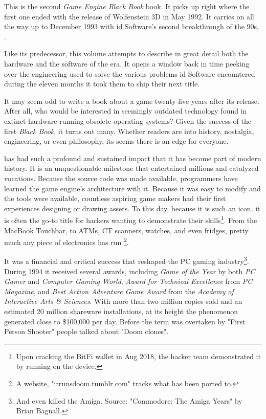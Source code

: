 This is the second \textit{Game Engine Black Book} book. It picks up right where the first one ended with the release of Wolfenstein 3D in May 1992. It carries on all the way up to December 1993 with id Software's second breakthrough of the 90s, \doom{}.\\ %
\par
 Like its predecessor, this volume attempts to describe in great detail both the hardware and the software of the era. It opens a window back in time peeking over the engineering used to solve the various problems id Software encountered during the eleven months it took them to ship their next title.\\%
\par
It may seem odd to write a book about a game twenty-five years after its release. After all, who would be interested in seemingly outdated technology found in extinct hardware running obsolete operating systems? Given the success of the first \textit{Black Book}, it turns out many. Whether readers are into history, nostalgia, engineering, or even philosophy, its seems there is an edge for everyone.\\ 

\par
\doom{} has had such a profound and sustained impact that it has become part of modern history. It is an unquestionable milestone that entertained millions and catalyzed vocations. Because the source code was made available, programmers have learned the game engine's architecture with it. Because it was easy to modify and the tools were available, countless aspiring game makers had their first experiences designing or drawing assets. To this day, because it is such an icon, it is often the go-to title for hackers wanting to demonstrate their skills\footnote{Upon cracking the BitFi wallet in Aug 2018, the hacker team demonstrated it by running \doom{} on the device.}. From the MacBook Touchbar, to ATMs, CT scanners, watches, and even fridges, pretty much any piece of electronics has run \doom{} \footnote{A website, "itrunsdoom{}.tumblr.com" tracks what \doom{} has been ported to.}.\\
\par

It was a financial and critical success that reshaped the PC gaming industry\footnote{And even killed the Amiga. Source: "Commodore: The Amiga Years" by Brian Bagnall.}. During 1994 it received several awards, including \textit{Game of the Year} by both \textit{PC Gamer} and \textit{Computer Gaming World}, \textit{Award for Technical Excellence} from \textit{PC Magazine}, and \textit{Best Action Adventure Game Award} from the \textit{Academy of Interactive Arts \& Sciences}. With more than two million copies sold and an estimated 20 million shareware installations, at its height the phenomenon generated close to \$100,000 per day. Before the term was overtaken by "First Person Shooter" people talked about "Doom clones".\\
\par

